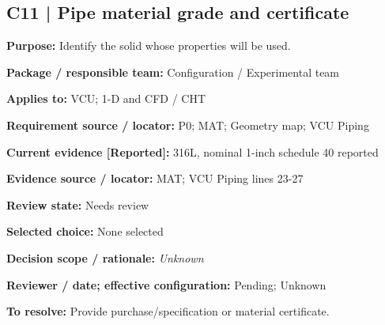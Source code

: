 \documentclass[11pt]{article}
\begin{document}
\par\noindent\begin{minipage}{\textwidth}\small\setlength{\parskip}{2pt}
\subsection*{C11 | Pipe material grade and certificate}
\textbf{Purpose:} Identify the solid whose properties will be used.\par
\textbf{Package / responsible team:} Configuration / Experimental team\par
\textbf{Applies to:} VCU; 1-D and CFD / CHT\par
\textbf{Requirement source / locator:} P0; MAT; Geometry map; VCU Piping\par
\textbf{Current evidence [Reported]:} 316L, nominal 1-inch schedule 40 reported\par
\textbf{Evidence source / locator:} MAT; VCU Piping lines 23-27\par
\textbf{Review state:} Needs review\par
\textbf{Selected choice:} None selected\par
\textbf{Decision scope / rationale:} \textit{Unknown}\par
\textbf{Reviewer / date; effective configuration:} Pending; Unknown\par
\textbf{To resolve:} Provide purchase/specification or material certificate.\par
\end{minipage}\par\vspace{5pt}
\end{document}
